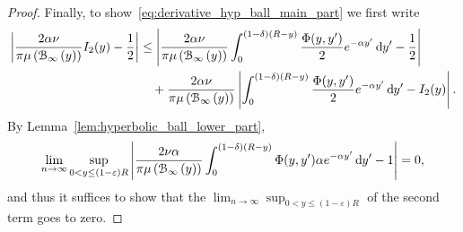 \begin{appendices}
\begin{proof}
Finally, to show~\eqref{eq:derivative_hyp_ball_main_part} we first write
\begin{align*}
	\left|\frac{2\alpha \nu}{\pi \mu\left({\mathcal B}_{\infty}\left(y\right)\right)} I_2(y) - \frac{1}{2}\right|
	&\le \left|\frac{2\alpha \nu}{\pi \mu\left({\mathcal B}_{\infty}\left(y\right)\right)}  \int_0^{(1-\delta)(R- y)} \frac{\Phi(y,y^\prime)}{2} 
		e^{-\alpha y^\prime} \operatorname{\mathrm{d}\hspace{-2pt}} y^\prime - \frac{1}{2}\right| \\
	&\hspace{10pt}+ \frac{2\alpha \nu}{\pi \mu\left({\mathcal B}_{\infty}\left(y\right)\right)}\left|\int_0^{(1-\delta)(R- y)} 
		\frac{\Phi(y,y^\prime)}{2} e^{-\alpha y^\prime} \operatorname{\mathrm{d}\hspace{-2pt}} y^\prime - I_2(y)\right|.
\end{align*}
By Lemma~\ref{lem:hyperbolic_ball_lower_part},
\[
	\lim_{n \to \infty} \sup_{0 < y \le (1-\varepsilon)R} \left|\frac{2\nu \alpha}{\pi \mu\left({\mathcal B}_{\infty}\left(y\right)\right)} 
	\int_{0}^{(1-\delta)(R-y)} \Phi(y,y^\prime) \alpha e^{-\alpha y^\prime} \operatorname{\mathrm{d}\hspace{-2pt}} y^\prime
	- 1\right| = 0,
\] 
and thus it suffices to show that the $\lim_{n \to \infty} \sup_{0 < y \le (1-\varepsilon)R}$ of the second term goes to zero.


\end{proof}
\end{appendices}
